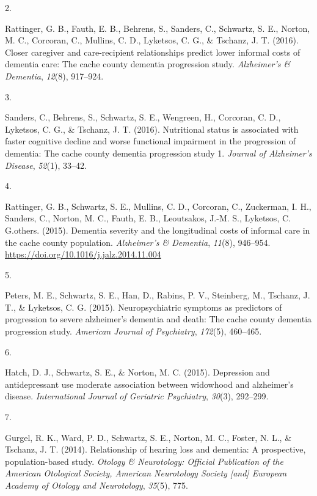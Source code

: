 \documentclass[11pt,a4paper,]{moderncv}
\newlength{\csllabelwidth}
\newcommand{\CSLLeftMargin}[1]{\parbox[t]{\csllabelwidth}{#1}}
\newcommand{\CSLRightInline}[1]{\parbox[t]{\linewidth - \csllabelwidth}{#1}}
\begin{document}
\leavevmode{}%
\CSLLeftMargin{2. }
\CSLRightInline{Rattinger, G. B., Fauth, E. B., Behrens, S., Sanders,
C., Schwartz, S. E., Norton, M. C., Corcoran, C., Mullins, C. D.,
Lyketsos, C. G., \& Tschanz, J. T. (2016). Closer caregiver and
care-recipient relationships predict lower informal costs of dementia
care: The cache county dementia progression study. \emph{Alzheimer's \&
Dementia}, \emph{12}(8), 917--924.}

\leavevmode{}%
\CSLLeftMargin{3. }
\CSLRightInline{Sanders, C., Behrens, S., Schwartz, S. E., Wengreen, H.,
Corcoran, C. D., Lyketsos, C. G., \& Tschanz, J. T. (2016). Nutritional
status is associated with faster cognitive decline and worse functional
impairment in the progression of dementia: The cache county dementia
progression study 1. \emph{Journal of Alzheimer's Disease},
\emph{52}(1), 33--42.}

\leavevmode{}%
\CSLLeftMargin{4. }
\CSLRightInline{Rattinger, G. B., Schwartz, S. E., Mullins, C. D.,
Corcoran, C., Zuckerman, I. H., Sanders, C., Norton, M. C., Fauth, E.
B., Leoutsakos, J.-M. S., Lyketsos, C. G.others. (2015). Dementia
severity and the longitudinal costs of informal care in the cache county
population. \emph{Alzheimer's \& Dementia}, \emph{11}(8), 946--954.
\url{https://doi.org/10.1016/j.jalz.2014.11.004}}

\leavevmode{}%
\CSLLeftMargin{5. }
\CSLRightInline{Peters, M. E., Schwartz, S. E., Han, D., Rabins, P. V.,
Steinberg, M., Tschanz, J. T., \& Lyketsos, C. G. (2015).
Neuropsychiatric symptoms as predictors of progression to severe
alzheimer's dementia and death: The cache county dementia progression
study. \emph{American Journal of Psychiatry}, \emph{172}(5), 460--465.}

\leavevmode{}%
\CSLLeftMargin{6. }
\CSLRightInline{Hatch, D. J., Schwartz, S. E., \& Norton, M. C. (2015).
Depression and antidepressant use moderate association between widowhood
and alzheimer's disease. \emph{International Journal of Geriatric
Psychiatry}, \emph{30}(3), 292--299.}

\leavevmode{}%
\CSLLeftMargin{7. }
\CSLRightInline{Gurgel, R. K., Ward, P. D., Schwartz, S. E., Norton, M.
C., Foster, N. L., \& Tschanz, J. T. (2014). Relationship of hearing
loss and dementia: A prospective, population-based study. \emph{Otology
\& Neurotology: Official Publication of the American Otological Society,
American Neurotology Society {[}and{]} European Academy of Otology and
Neurotology}, \emph{35}(5), 775.}
\end{document}
